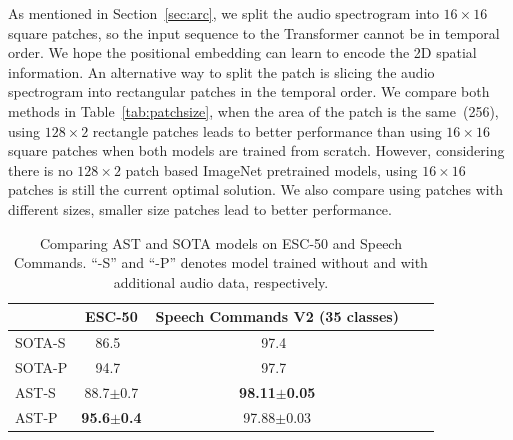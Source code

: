 \documentclass[a4paper]{article}
\newcommand{\squeezeup}{\vspace{-2.0mm}}
\begin{document}
 As mentioned in Section~\ref{sec:arc}, we split the audio spectrogram into $16\times16$ square patches, so the input sequence to the Transformer cannot be in temporal order. We hope the positional embedding can learn to encode the 2D spatial information. An alternative way to split the patch is slicing the audio spectrogram into rectangular patches in the temporal order. We compare both methods in Table~\ref{tab:patchsize}, when the area of the patch is the same~(256), using $128\times2$ rectangle patches leads to better performance than using $16\times16$ square patches when both models are trained from scratch. However, considering there is no $128\times2$ patch based ImageNet pretrained models, using $16\times16$ patches is still the current optimal solution. We also compare using patches with different sizes, smaller size patches lead to better performance.

\begin{table}[t]
\footnotesize
\centering
\caption{Comparing AST and SOTA models on ESC-50 and Speech Commands. ``-S'' and ``-P'' denotes model trained without and with additional audio data, respectively.}
\label{tab:transfer}
\begin{tabular}{@{}lcccc@{}}
\toprule
                         & ESC-50 & Speech Commands V2 (35 classes)  \\ \midrule
SOTA-S  &          86.5~\cite{sailor2017unsupervised}                  &     97.4~\cite{majumdar2020matchboxnet}                                                                                                  \\
SOTA-P  &        94.7~\cite{kong2020panns}                    &     97.7~\cite{lin2020training}                                                                                      \\ \midrule
AST-S                       &   88.7$\pm$0.7                    &   \bf{98.11$\pm$0.05}                                                                           \\

AST-P                     &  \bf{95.6$\pm$0.4}                         &   97.88$\pm$0.03                                                                           \\
\bottomrule
\end{tabular}
\squeezeup
\end{table}
\end{document}
